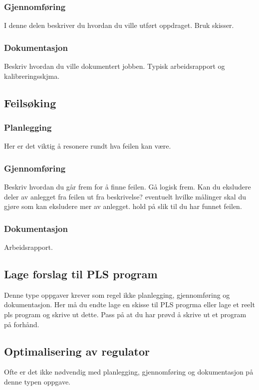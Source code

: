 \subsubsection*{Gjennomføring}

I denne delen beskriver du hvordan du ville utført oppdraget. Bruk skisser. 


\subsubsection*{Dokumentasjon}

Beskriv hvordan du ville dokumentert jobben. Typisk arbeidsrapport og kalibreringsskjma. 


\subsection{Feilsøking}

\subsubsection*{Planlegging}
Her er det viktig å resonere rundt hva feilen kan være.

\vskip 5pt 


\subsubsection*{Gjennomføring}
Beskriv hvordan du går frem for å finne feilen. Gå logisk frem. Kan du eksludere deler av anlegget fra feilen ut fra beskrivelse? eventuelt hvilke målinger skal du gjøre som kan eksludere mer av anlegget. hold på slik til du har funnet feilen. 
\subsubsection*{Dokumentasjon}
Arbeidsrapport. 

\subsection{Lage forslag til PLS program}
Denne type oppgaver krever som regel ikke  planlegging, gjennomføring og dokumentasjon.
\vskip 5pt 
Her må du endte lage en skisse til PLS progrma eller lage et reelt pls program og skrive ut dette. Pass på at du har prøvd å skrive ut et program på forhånd. 
\subsection{Optimalisering av regulator}
Ofte er det ikke nødvendig med  planlegging, gjennomføring og dokumentasjon på denne typen oppgave. 
\vskip 5pt 
